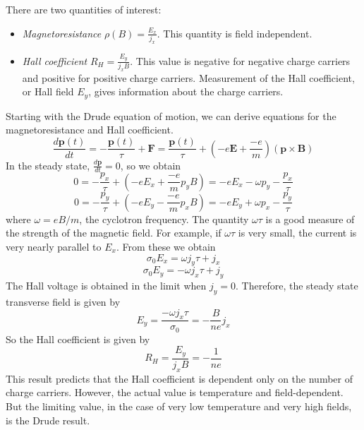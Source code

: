 \documentclass[10pt]{article}
\begin{document}
There are two quantities of interest:
\begin{itemize}
  \item \emph{Magnetoresistance} $\rho(B) = \frac{E_{x}}{j_{x}}$. This quantity is field independent.
  \item \emph{Hall coefficient} $R_{H} = \frac{E_{y}}{j_{x}B}$. This value is negative for negative charge carriers
  and positive for positive charge carriers. Measurement of the Hall coefficient, or Hall field $E_{y}$, gives information
  about the charge carriers.
\end{itemize}

Starting with the Drude equation of motion, we can derive equations for the magnetoresistance and Hall coefficient.
$$\frac{d\textbf{p}(t)}{dt} =  - \frac{\textbf{p}(t)}{\tau} + \textbf{F} = \frac{\textbf{p}(t)}{\tau} + (-e\textbf{E} + \frac{-e}{m})(\textbf{p}\times\textbf{B})$$
In the steady state, $\frac{d\textbf{p}}{dt} = 0$, so we obtain
$$
0 = -\frac{p_{x}}{\tau} + (-eE_{x} + \frac{-e}{m}p_{y}B) = -eE_{x} - \omega p_{y} - \frac{p_{x}}{\tau}
$$
$$
0 = -\frac{p_{y}}{\tau} + (-eE_{y} - \frac{-e}{m}p_{x}B) = -eE_{y} + \omega p_{x} - \frac{p_{y}}{\tau}
$$
where $\omega = eB/m$, the cyclotron frequency. The quantity $\omega \tau$ is a good
measure of the strength of the magnetic field. For example, if $\omega \tau$ is very small, the current
is very nearly parallel to $E_{x}$.  From these we obtain
$$
\sigma_{0}E_{x} = \omega j_{y}\tau + j_{x}
$$
$$
\sigma_{0}E_{y} = - \omega j_{x} \tau + j_{y}
$$
The Hall voltage is obtained in the limit when $j_{y} = 0$. Therefore, the steady state transverse field is given by
$$E_{y} = \frac{- \omega j_{x}\tau}{\sigma_{0}} = -\frac{B}{ne}j_{x}$$
So the Hall coefficient is given by
$$R_{H} = \frac{E_{y}}{j_{x}B} = -\frac{1}{ne}$$
This result predicts that the Hall coefficient is dependent only on the number of charge carriers. However, the actual value is
temperature and field-dependent. But the limiting value, in the case of very low temperature and very high fields, is the Drude
result.
\end{document}
